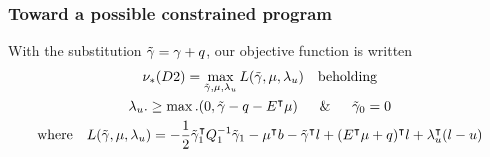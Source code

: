 \documentclass[twoside]{mfitjournal}
\begin{document}
\subsubsection*{Toward a possible constrained program}
With the substitution $\Tilde{\gamma} = \gamma + q$, our objective function is written
    \begin{gather*}
    \nu_*(D2) = \max_{\Tilde{\gamma}, \mu, \lambda_u} L(\Tilde{\gamma}, \mu, \lambda_u) \quad \textrm{beholding} \\
    \lambda_u .\ge \max.(0, \Tilde{\gamma} - q - E^\intercal\mu) \quad \And \quad \Tilde{\gamma}_0 = 0    \\
    \textrm{where} \quad L(\Tilde{\gamma}, \mu, \lambda_u) = -\frac{1}{2} \Tilde{\gamma}_1^\intercal Q_1^{-1}\Tilde{\gamma}_1 - \mu^\intercal b - \Tilde{\gamma}^\intercal l + (E^\intercal\mu + q)^\intercal l + \lambda_u^\intercal(l-u)
    \end{gather*}
\end{document}
